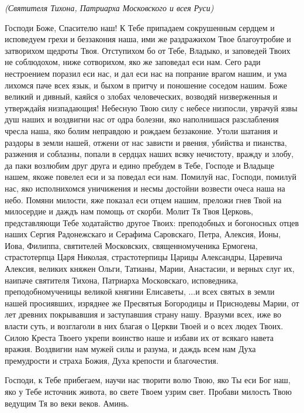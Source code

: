 \itshape (Святителя Тихона, Патриарха Московского и всея  Руси)

\normalfont{}Господи Боже, Спасителю наш! К Тебе припадаем сокрушенным сердцем и исповедуем грехи и беззакония наша, ими же раздражихом Твое благоутробие и затворихом щедроты Твоя. Отступихом бо от Тебе, Владыко, и заповедей Твоих не соблюдохом, ниже сотворихом, яко же заповедал еси нам. Сего ради нестроением поразил еси нас, и дал еси нас на попрание врагом нашим, и ума лихомся паче всех язык, и быхом в притчу и поношение соседом нашим. Боже великий и дивный, каяйся о злобах человеческих, возводяй низверженныя и утверждайя низпадающия! Небесную Твою силу с небесе низпосли, уврачуй язвы душ наших и воздвигни нас от одра болезни, яко наполнишася разслабления чресла наша, яко болим неправдою и рождаем беззаконие. Утоли шатания и раздоры в земли нашей, отжени от нас зависти и рвения, убийства и пианства, разжения и соблазны, попали в сердцах наших всяку нечистоту, вражду и злобу, да паки возлюбим друг друга и едино пребудем в Тебе, Господе и Владыце нашем, якоже повелел еси и за поведал еси нам. Помилуй нас, Господи, помилуй нас, яко исполнихомся уничижения и несмы достойни возвести очеса наша на небо. Помяни милости, яже показал еси отцем нашим, преложи гнев Твой на милосердие и даждъ нам помощь от скорби. Молит Тя Твоя Церковь, представляющи Тебе ходатайство другое Твоих: преподобных и богоносных отцев наших Сергия Радонежскаго и Серафима Саровскаго, Петра, Алексия, Ионы, Иова, Филиппа, святителей Московских, священномученика Ермогена, страстотерпца Царя Николая, страстотерпицы Царицы Александры, Царевича Алексия, великих княжен Ольги, Татианы, Марии, Анастасии, и верных слуг их, наипаче святителя Тихона, Патриарха Московскаго, исповедника, преподобномученицы великой княгини Елисаветы, ...и всех святых в земли нашей просиявших, изряднее же Пресвятыя Богородицы и Приснодевы Марии, от лет древних покрывавшия и заступавшия страну нашу. Вразуми всех, иже во власти суть, и возглаголи в них благая о Церкви Твоей и о всех людех Твоих. Силою Креста Твоего укрепи воинство наше и избави их от всякаго навета вражия. Воздвигни нам мужей силы и разума, и даждь всем нам Духа премудрости и страха Божия, Духа крепости и благочестия. 

Господи, к Тебе прибегаем, научи нас творити волю Твою, яко Ты еси Бог наш, яко у Тебе источник живота, во свете Твоем узрим свет. Пробави милость Твою ведущим Тя во веки веков. Аминь. 


\bigskip\bigskip\mychapterending
